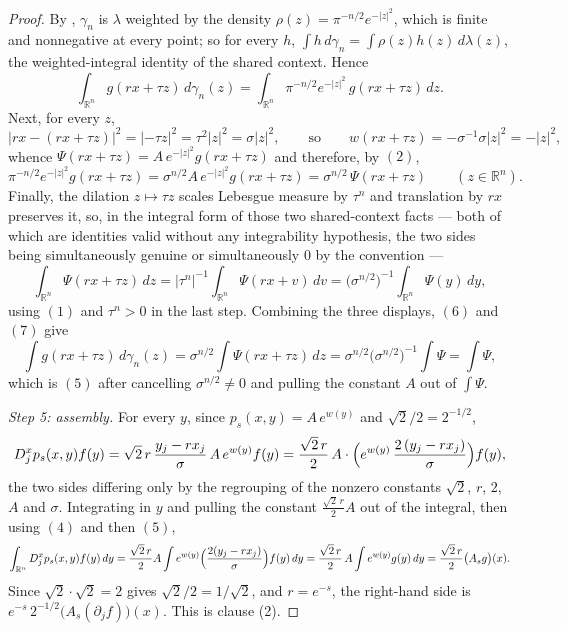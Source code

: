 \begin{proof}
By , $\gamma_n$ is $\lambda$ weighted by the density
$\rho(z) = \pi^{-n/2}e^{-|z|^2}$, which is finite and nonnegative at every point; so for
every $h$,
$\int h\,d\gamma_n = \int \rho(z)h(z)\,d\lambda(z)$, the weighted-integral identity of the
shared context.  Hence
\[
  \int_{\mathbb{R}^n} g(rx+\tau z)\,d\gamma_n(z)
    = \int_{\mathbb{R}^n} \pi^{-n/2}e^{-|z|^2}\,g(rx+\tau z)\,dz .
\]
Next, for every $z$,
\[
  |rx-(rx+\tau z)|^2 = |{-\tau z}|^2 = \tau^2|z|^2 = \sigma|z|^2 ,
  \qquad\text{so}\qquad
  w(rx+\tau z) = -\sigma^{-1}\sigma|z|^2 = -|z|^2 ,
\]
whence $\Psi(rx+\tau z) = A\,e^{-|z|^2}g(rx+\tau z)$ and therefore, by $(2)$,
\begin{equation*}
  \pi^{-n/2}e^{-|z|^2}g(rx+\tau z)
    = \sigma^{n/2}A\,e^{-|z|^2}g(rx+\tau z)
    = \sigma^{n/2}\,\Psi(rx+\tau z) \qquad (z \in \mathbb{R}^n) . \tag{6}
\end{equation*}
Finally, the dilation $z \mapsto \tau z$ scales Lebesgue measure by $\tau^n$ and
translation by $rx$ preserves it, so, in the integral form of those two shared-context
facts --- both of which are identities valid without any integrability hypothesis, the
two sides being simultaneously genuine or simultaneously $0$ by the convention ---
\begin{equation*}
  \int_{\mathbb{R}^n}\Psi(rx+\tau z)\,dz
    = |\tau^n|^{-1}\int_{\mathbb{R}^n}\Psi(rx+v)\,dv
    = \bigl(\sigma^{n/2}\bigr)^{-1}\int_{\mathbb{R}^n}\Psi(y)\,dy , \tag{7}
\end{equation*}
using $(1)$ and $\tau^n > 0$ in the last step.  Combining the three displays, $(6)$ and
$(7)$ give
\[
  \int g(rx+\tau z)\,d\gamma_n(z)
    = \sigma^{n/2}\int\Psi(rx+\tau z)\,dz
    = \sigma^{n/2}\bigl(\sigma^{n/2}\bigr)^{-1}\int\Psi
    = \int\Psi ,
\]
which is $(5)$ after cancelling $\sigma^{n/2} \neq 0$ and pulling the constant $A$ out of
$\int\Psi$.

\emph{Step 5: assembly.}
For every $y$, since $p_s(x,y) = A\,e^{w(y)}$ and $\sqrt2/2 = 2^{-1/2}$,
\[
  D_j^xp_s(x,y)f(y)
    = \sqrt2\,r\,\frac{y_j-rx_j}{\sigma}\,A\,e^{w(y)}f(y)
    = \frac{\sqrt2\,r}{2}\,A\cdot
        \Bigl(e^{w(y)}\,\frac{2\,(y_j-rx_j)}{\sigma}\Bigr)f(y) ,
\]
the two sides differing only by the regrouping of the nonzero constants
$\sqrt2$, $r$, $2$, $A$ and $\sigma$.  Integrating in $y$ and pulling the constant
$\tfrac{\sqrt2\,r}{2}A$ out of the integral, then using $(4)$ and then $(5)$,
\[
  \int_{\mathbb{R}^n} D_j^xp_s(x,y)f(y)\,dy
    = \frac{\sqrt2\,r}{2}A\int e^{w(y)}\Bigl(\frac{2(y_j-rx_j)}{\sigma}\Bigr)f(y)\,dy
    = \frac{\sqrt2\,r}{2}\,A\int e^{w(y)}g(y)\,dy
    = \frac{\sqrt2\,r}{2}\bigl(A_sg\bigr)(x) .
\]
Since $\sqrt2\cdot\sqrt2 = 2$ gives $\sqrt2/2 = 1/\sqrt2$, and $r = e^{-s}$, the
right-hand side is $e^{-s}\,2^{-1/2}\bigl(A_s(\partial_jf)\bigr)(x)$.  This is clause (2).
\end{proof}
